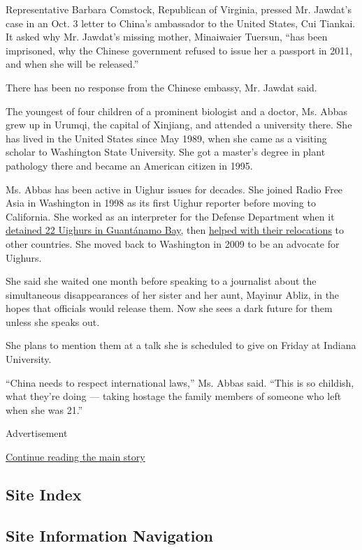 Representative Barbara Comstock, Republican of Virginia, pressed Mr.
Jawdat's case in an Oct. 3 letter to China's ambassador to the United
States, Cui Tiankai. It asked why Mr. Jawdat's missing mother,
Minaiwaier Tuersun, ``has been imprisoned, why the Chinese government
refused to issue her a passport in 2011, and when she will be
released.''

There has been no response from the Chinese embassy, Mr. Jawdat said.

The youngest of four children of a prominent biologist and a doctor, Ms.
Abbas grew up in Urumqi, the capital of Xinjiang, and attended a
university there. She has lived in the United States since May 1989,
when she came as a visiting scholar to Washington State University. She
got a master's degree in plant pathology there and became an American
citizen in 1995.

Ms. Abbas has been active in Uighur issues for decades. She joined Radio
Free Asia in Washington in 1998 as its first Uighur reporter before
moving to California. She worked as an interpreter for the Defense
Department when it
\href{https://www.nytimes.com/2014/01/01/us/us-frees-last-of-uighur-detainees-from-guantanamo.html}{detained
22 Uighurs in Guantánamo Bay}, then
\href{https://www.nytimes.com/2009/06/15/world/americas/15uighur.html}{helped
with their relocations} to other countries. She moved back to Washington
in 2009 to be an advocate for Uighurs.

She said she waited one month before speaking to a journalist about the
simultaneous disappearances of her sister and her aunt, Mayinur Abliz,
in the hopes that officials would release them. Now she sees a dark
future for them unless she speaks out.

She plans to mention them at a talk she is scheduled to give on Friday
at Indiana University.

``China needs to respect international laws,'' Ms. Abbas said. ``This is
so childish, what they're doing --- taking hostage the family members of
someone who left when she was 21.''

Advertisement

\protect\hyperlink{after-bottom}{Continue reading the main story}

\hypertarget{site-index}{%
\subsection{Site Index}\label{site-index}}

\hypertarget{site-information-navigation}{%
\subsection{Site Information
Navigation}\label{site-information-navigation}}

